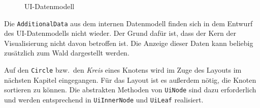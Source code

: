 \begin{figure}[htb]
\caption{UI-Datenmodell}
\label{fig:ui-model}
\end{figure}

Die \texttt{AdditionalData} aus dem internen Datenmodell finden sich in dem Entwurf des UI-Datenmodells nicht wieder. Der Grund dafür ist, dass der Kern der Visualisierung nicht davon betroffen ist. Die Anzeige dieser Daten kann beliebig zusätzlich zum Wald dargestellt werden.

Auf den \texttt{Circle} bzw.\ den \textit{Kreis} eines Knotens wird im Zuge des Layouts im nächsten Kapitel eingegangen. Für das Layout ist es außerdem nötig, die Knoten sortieren zu können. Die abstrakten Methoden von \texttt{UiNode} sind dazu erforderlich und werden entsprechend in \texttt{UiInnerNode} und \texttt{UiLeaf} realisiert.

